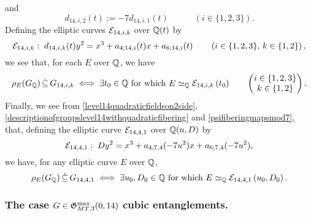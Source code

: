 and
\[
d_{14,i,2}(t) := -7d_{14,i,1}(t) \quad\quad\quad \left( i \in \{ 1, 2, 3 \} \right). 
\]
Defining the elliptic curves $\mathcal{E}_{14,i,k}$ over $\mathbb{Q}(t)$ by
\[
\mathcal{E}_{14,i,k} : \; d_{14,i,k}(t) y^2 = x^3 + a_{4;14,i}(t) x + a_{6;14,i}(t) \quad\quad \left( i \in \{1, 2, 3 \}, \, k \in \{1, 2 \} \right),
\]
we see that, for each $E$ over $\mathbb{Q}$, we have
\[
\rho_{E}(G_{\mathbb{Q}}) \, \dot\subseteq \, G_{14,i,k} \; \Longleftrightarrow \; \exists t_0 \in \mathbb{Q} \text{ for which } E \simeq_{\mathbb{Q}} \mathcal{E}_{14,i,k}\left( t_0 \right) \quad\quad \begin{pmatrix} i \in \{1, 2, 3 \} \\ k \in \{1, 2 \} \end{pmatrix}.
\]
Finally, we see from \eqref{level14quadraticfieldson2side}, \eqref{descriptionofgroupslevel14withquadraticfibering} and \eqref{psifiberingmapsmod7}, that, defining the elliptic curve $\mathcal{E}_{14,4,1}$ over $\mathbb{Q}(u,D)$ by
\[
\mathcal{E}_{14,4,1} : \; D y^2 = x^3 + a_{4;7,4}(-7u^2) x + a_{6;7,4}(-7u^2),
\]
we have, for any elliptic curve $E$ over $\mathbb{Q}$,
\[
\rho_{E}(G_{\mathbb{Q}}) \, \dot\subseteq \, G_{14,4,1} \; \Longleftrightarrow \; \exists u_0,D_0 \in \mathbb{Q} \text{ for which } E \simeq_{\mathbb{Q}} \mathcal{E}_{14,4,1}\left( u_0,D_0 \right).
\]

\subsubsection{The case \texorpdfstring{$G \in \mathfrak{G}_{MT,3}^{\max}(0,14)$}: cubic entanglements.}

